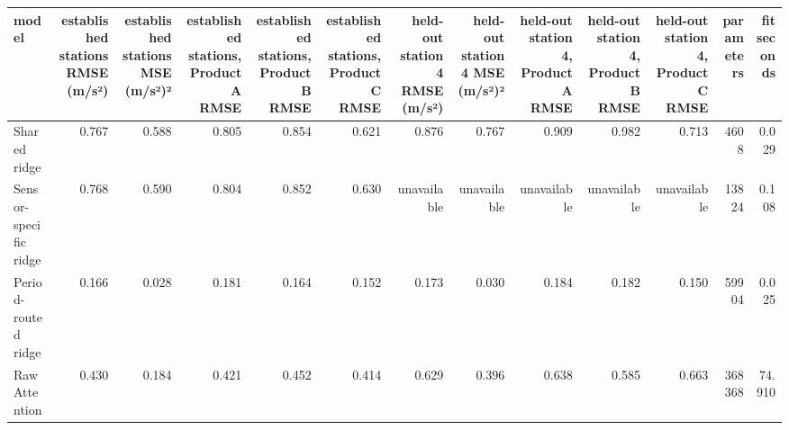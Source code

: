 \begin{tabular}{lrrrrrrrrrrrr}
\toprule
model & established stations RMSE (m/s²) & established stations MSE (m/s²)² & established stations, Product A RMSE & established stations, Product B RMSE & established stations, Product C RMSE & held-out station 4 RMSE (m/s²) & held-out station 4 MSE (m/s²)² & held-out station 4, Product A RMSE & held-out station 4, Product B RMSE & held-out station 4, Product C RMSE & parameters & fit seconds \\
\midrule
Shared ridge & 0.767 & 0.588 & 0.805 & 0.854 & 0.621 & 0.876 & 0.767 & 0.909 & 0.982 & 0.713 & 4608 & 0.029 \\
Sensor-specific ridge & 0.768 & 0.590 & 0.804 & 0.852 & 0.630 & unavailable & unavailable & unavailable & unavailable & unavailable & 13824 & 0.108 \\
Period-routed ridge & 0.166 & 0.028 & 0.181 & 0.164 & 0.152 & 0.173 & 0.030 & 0.184 & 0.182 & 0.150 & 59904 & 0.025 \\
Raw Attention & 0.430 & 0.184 & 0.421 & 0.452 & 0.414 & 0.629 & 0.396 & 0.638 & 0.585 & 0.663 & 368368 & 74.910 \\
\bottomrule
\end{tabular}
